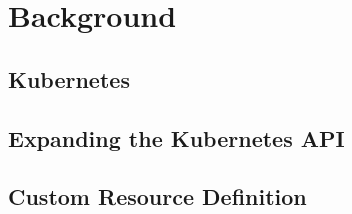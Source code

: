 \chapter{Background}

\section{Kubernetes}

\section{Expanding the Kubernetes API}

\section{Custom Resource Definition}
